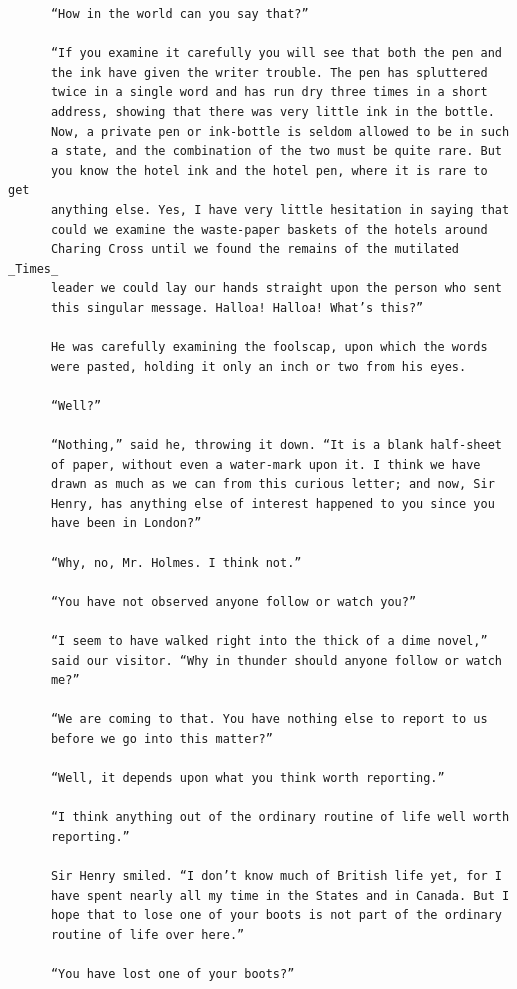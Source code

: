 \documentclass{article}
\begin{document}
\begin{verbatim}
      “How in the world can you say that?”

      “If you examine it carefully you will see that both the pen and
      the ink have given the writer trouble. The pen has spluttered
      twice in a single word and has run dry three times in a short
      address, showing that there was very little ink in the bottle.
      Now, a private pen or ink-bottle is seldom allowed to be in such
      a state, and the combination of the two must be quite rare. But
      you know the hotel ink and the hotel pen, where it is rare to get
      anything else. Yes, I have very little hesitation in saying that
      could we examine the waste-paper baskets of the hotels around
      Charing Cross until we found the remains of the mutilated _Times_
      leader we could lay our hands straight upon the person who sent
      this singular message. Halloa! Halloa! What’s this?”

      He was carefully examining the foolscap, upon which the words
      were pasted, holding it only an inch or two from his eyes.

      “Well?”

      “Nothing,” said he, throwing it down. “It is a blank half-sheet
      of paper, without even a water-mark upon it. I think we have
      drawn as much as we can from this curious letter; and now, Sir
      Henry, has anything else of interest happened to you since you
      have been in London?”

      “Why, no, Mr. Holmes. I think not.”

      “You have not observed anyone follow or watch you?”

      “I seem to have walked right into the thick of a dime novel,”
      said our visitor. “Why in thunder should anyone follow or watch
      me?”

      “We are coming to that. You have nothing else to report to us
      before we go into this matter?”

      “Well, it depends upon what you think worth reporting.”

      “I think anything out of the ordinary routine of life well worth
      reporting.”

      Sir Henry smiled. “I don’t know much of British life yet, for I
      have spent nearly all my time in the States and in Canada. But I
      hope that to lose one of your boots is not part of the ordinary
      routine of life over here.”

      “You have lost one of your boots?”


\end{verbatim}
\end{document}
